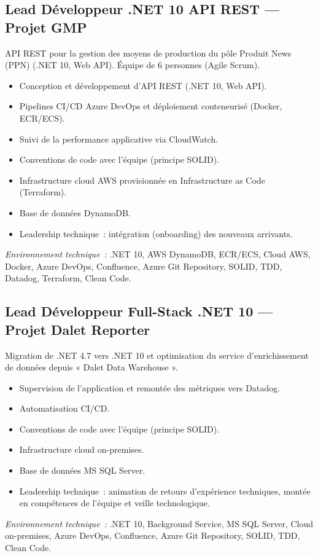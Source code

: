 \documentclass[10pt,a4paper]{article}
\begin{document}
\subsection*{Lead Développeur .NET 10 API REST --- Projet GMP}
\color{darkgray}
API REST pour la gestion des moyens de production du pôle Produit News (PPN) (.NET 10, Web API). Équipe de 6 personnes (Agile Scrum).
\begin{itemize}
  \item Conception et développement d'API REST (.NET 10, Web API).
  \item Pipelines CI/CD Azure DevOps et déploiement conteneurisé (Docker, ECR/ECS).
  \item Suivi de la performance applicative via CloudWatch.
  \item Conventions de code avec l'équipe (principe SOLID).
  \item Infrastructure cloud AWS provisionnée en Infrastructure as Code (Terraform).
  \item Base de données DynamoDB.
  \item Leadership technique~: intégration (onboarding) des nouveaux arrivants.
\end{itemize}
\textit{Environnement technique~:} .NET 10, AWS DynamoDB, ECR/ECS, Cloud AWS, Docker, Azure DevOps, Confluence, Azure Git Repository, SOLID, TDD, Datadog, Terraform, Clean Code.

\vspace{6pt}

\subsection*{Lead Développeur Full-Stack .NET 10 --- Projet Dalet Reporter}
\color{darkgray}
Migration de .NET 4.7 vers .NET 10 et optimisation du service d'enrichissement de données depuis « Dalet Data Warehouse ».
\begin{itemize}
  \item Supervision de l'application et remontée des métriques vers Datadog.
  \item Automatisation CI/CD.
  \item Conventions de code avec l'équipe (principe SOLID).
  \item Infrastructure cloud on-premises.
  \item Base de données MS SQL Server.
  \item Leadership technique~: animation de retours d'expérience techniques, montée en compétences de l'équipe et veille technologique.
\end{itemize}
\textit{Environnement technique~:} .NET 10, Background Service, MS SQL Server, Cloud on-premises, Azure DevOps, Confluence, Azure Git Repository, SOLID, TDD, Clean Code.
\end{document}
